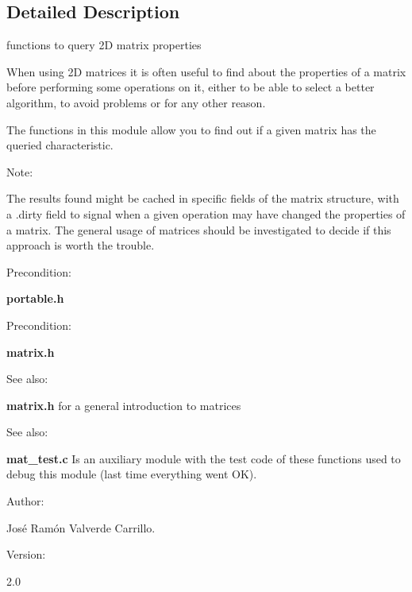 \subsection{Detailed Description}
functions to query 2D matrix properties



When using 2D matrices it is often useful to find about the properties of a matrix before performing some operations on it, either to be able to select a better algorithm, to avoid problems or for any other reason.

The functions in this module allow you to find out if a given matrix has the queried characteristic.

\begin{Desc}
\item[Note: ]\par
The results found might be cached in specific fields of the matrix structure, with a .dirty field to signal when a given operation may have changed the properties of a matrix. The general usage of matrices should be investigated to decide if this approach is worth the trouble.\end{Desc}
\begin{Desc}
\item[Precondition: ]\par
{\bf portable.h}\end{Desc}
\begin{Desc}
\item[Precondition: ]\par
{\bf matrix.h}\end{Desc}
\begin{Desc}
\item[See also: ]\par
{\bf matrix.h} for a general introduction to matrices\end{Desc}
\begin{Desc}
\item[See also: ]\par
{\bf mat\_\-test.c} Is an auxiliary module with the test code of these functions used to debug this module (last time everything went OK).\end{Desc}
\begin{Desc}
\item[Author: ]\par
Jos\'{e} Ram\'{o}n Valverde Carrillo.\end{Desc}
\begin{Desc}
\item[Version: ]\par
2.0\end{Desc}
